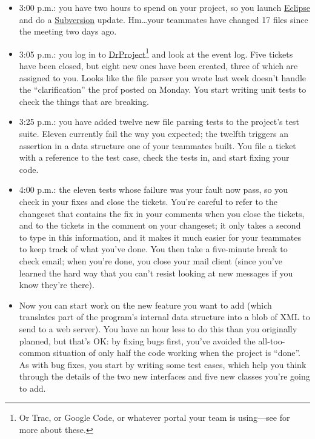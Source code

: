 \documentclass{report}
\begin{document}
\begin{itemize}

  \item 3:00 p.m.: you have two hours to spend on your project, so you
  launch \url{Eclipse} and do a \url{Subversion}
  update. Hm{\ldots}your teammates have changed 17 files since the
  meeting two days ago.

  \item 3:05 p.m.: you log in to \url{DrProject}\footnote{Or Trac, or
  Google Code, or whatever portal your team is using---see
   for more about these.} and look at the
  event log.  Five tickets have been closed, but eight new ones have
  been created, three of which are assigned to you.  Looks like the
  file parser you wrote last week doesn't handle the ``clarification''
  the prof posted on Monday.  You start writing unit tests to check
  the things that are breaking.

  \item 3:25 p.m.: you have added twelve new file parsing tests to the
  project's test suite.  Eleven currently fail the way you expected;
  the twelfth triggers an assertion in a data structure one of your
  teammates built.  You file a ticket with a reference to the test
  case, check the tests in, and start fixing your code.

  \item 4:00 p.m.: the eleven tests whose failure was your fault now
  pass, so you check in your fixes and close the tickets.  You're
  careful to refer to the changeset that contains the fix in your
  comments when you close the tickets, and to the tickets in the
  comment on your changeset; it only takes a second to type in this
  information, and it makes it much easier for your teammates to keep
  track of what you've done.  You then take a five-minute break to
  check email; when you're done, you close your mail client (since
  you've learned the hard way that you can't resist looking at new
  messages if you know they're there).

  \item Now you can start work on the new feature you want to add
  (which translates part of the program's internal data structure into
  a blob of XML to send to a web server).  You have an hour less to do
  this than you originally planned, but that's OK: by fixing bugs
  first, you've avoided the all-too-common situation of only half the
  code working when the project is ``done''.  As with bug fixes, you
  start by writing some test cases, which help you think through the
  details of the two new interfaces and five new classes you're going
  to add.


\end{itemize}
\end{document}
